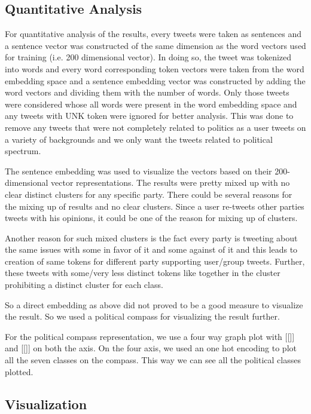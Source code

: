 \documentclass[10pt, oneside]{article}
\begin{document}
\begin{multicols}{2}
\section{Quantitative Analysis}

For quantitative analysis of the results, every tweets were taken as sentences and a sentence vector was constructed of the same dimension as the word vectors used for training (i.e. 200 dimensional vector). In doing so, the tweet was tokenized into words and every word corresponding token vectors were taken from the word embedding space and a sentence embedding vector was constructed by adding the word vectors and dividing them with the number of words. Only those tweets were considered whose all words were present in the word embedding space and any tweets with UNK token were ignored for better analysis. This was done to remove any tweets that were not completely related to politics as a user tweets on a variety of backgrounds and we only want the tweets related to political spectrum. 

The sentence embedding was used to visualize the vectors based on their 200-dimensional vector representations. The results were pretty mixed up with no clear distinct clusters for any specific party. There could be several reasons for the mixing up of results and no clear clusters. Since a user re-tweets other parties tweets with his opinions, it could be one of the reason for mixing up of clusters. 

Another reason for such mixed clusters is the fact every party is tweeting about the same issues with some in favor of it and some against of it and this leads to creation of same tokens for different party supporting user/group tweets. Further, these tweets with some/very less distinct tokens like together in the cluster prohibiting a distinct cluster for each class.

So a direct embedding as above did not proved to be a good measure to visualize the result. So we used a political compass for visualizing the result further. 

For the political compass representation, we use a four way graph plot with [[]] and [[]] on both the axis. On the four axis, we used an one hot encoding to plot all the seven classes on the compass. This way we can see all the political classes plotted. 

\subsection{Visualization}


\end{multicols}
\end{document}

